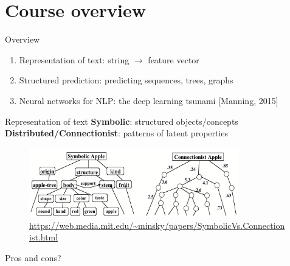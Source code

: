 \documentclass[usenames,dvipsnames,notes,11pt,aspectratio=169]{beamer}
\begin{document}
\section{Course overview}
\begin{frame}
    {Overview}
    \begin{enumerate}
        \item Representation of text: string $\rightarrow$ feature vector
        \item Structured prediction: predicting sequences, trees, graphs
        \item Neural networks for NLP: the deep learning tsunami [Manning, 2015]
    \end{enumerate}
\end{frame}

\begin{frame}
    {Representation of text}
        \textbf{Symbolic}: structured objects/concepts\\[1ex]
        \textbf{Distributed/Connectionist}: patterns of latent properties

    \begin{figure}
        \includegraphics[height=3cm]{figures/apple}
        \caption{\url{https://web.media.mit.edu/~minsky/papers/SymbolicVs.Connectionist.html}}
    \end{figure}

    Pros and cons?
\end{frame}
\end{document}

